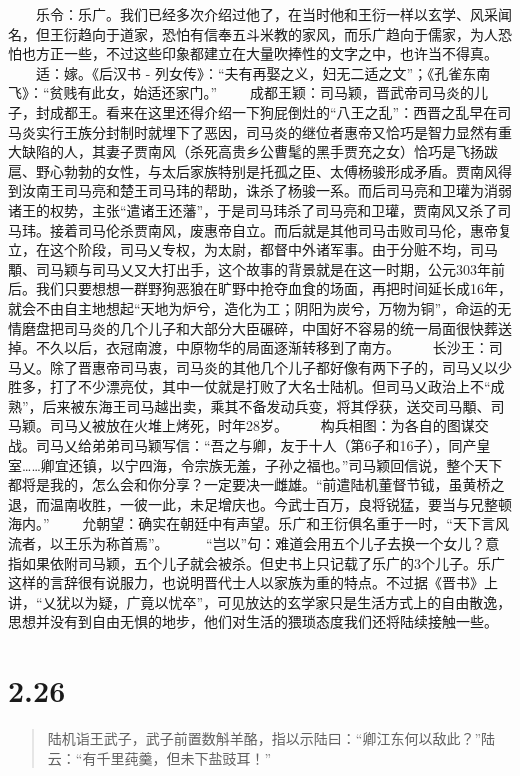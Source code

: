 \documentclass[]{book}
\begin{document}
　　乐令：乐广。我们已经多次介绍过他了，在当时他和王衍一样以玄学、风采闻名，但王衍趋向于道家，恐怕有信奉五斗米教的家风，而乐广趋向于儒家，为人恐怕也方正一些，不过这些印象都建立在大量吹捧性的文字之中，也许当不得真。
　　适：嫁。《后汉书 -
列女传》：``夫有再娶之义，妇无二适之文''；《孔雀东南飞》：``贫贱有此女，始适还家门。''
　　成都王颖：司马颖，晋武帝司马炎的儿子，封成都王。看来在这里还得介绍一下狗屁倒灶的``八王之乱''：西晋之乱早在司马炎实行王族分封制时就埋下了恶因，司马炎的继位者惠帝又恰巧是智力显然有重大缺陷的人，其妻子贾南风（杀死高贵乡公曹髦的黑手贾充之女）恰巧是飞扬跋扈、野心勃勃的女性，与太后家族特别是托孤之臣、太傅杨骏形成矛盾。贾南风得到汝南王司马亮和楚王司马玮的帮助，诛杀了杨骏一系。而后司马亮和卫瓘为消弱诸王的权势，主张``遣诸王还藩''，于是司马玮杀了司马亮和卫瓘，贾南风又杀了司马玮。接着司马伦杀贾南风，废惠帝自立。而后就是其他司马击败司马伦，惠帝复立，在这个阶段，司马乂专权，为太尉，都督中外诸军事。由于分赃不均，司马顒、司马颖与司马乂又大打出手，这个故事的背景就是在这一时期，公元303年前后。我们只要想想一群野狗恶狼在旷野中抢夺血食的场面，再把时间延长成16年，就会不由自主地想起``天地为炉兮，造化为工；阴阳为炭兮，万物为铜''，命运的无情磨盘把司马炎的几个儿子和大部分大臣碾碎，中国好不容易的统一局面很快葬送掉。不久以后，衣冠南渡，中原物华的局面逐渐转移到了南方。
　　长沙王：司马乂。除了晋惠帝司马衷，司马炎的其他几个儿子都好像有两下子的，司马乂以少胜多，打了不少漂亮仗，其中一仗就是打败了大名士陆机。但司马乂政治上不``成熟''，后来被东海王司马越出卖，乘其不备发动兵变，将其俘获，送交司马顒、司马颖。司马乂被放在火堆上烤死，时年28岁。
　　构兵相图：为各自的图谋交战。司马乂给弟弟司马颖写信：``吾之与卿，友于十人（第6子和16子），同产皇室\ldots{}\ldots{}卿宜还镇，以宁四海，令宗族无羞，子孙之福也。''司马颖回信说，整个天下都将是我的，怎么会和你分享？一定要决一雌雄。``前遣陆机董督节钺，虽黄桥之退，而温南收胜，一彼一此，未足增庆也。今武士百万，良将锐猛，要当与兄整顿海内。''
　　允朝望：确实在朝廷中有声望。乐广和王衍俱名重于一时，``天下言风流者，以王乐为称首焉''。
　　
``岂以''句：难道会用五个儿子去换一个女儿？意指如果依附司马颖，五个儿子就会被杀。但史书上只记载了乐广的3个儿子。乐广这样的言辞很有说服力，也说明晋代士人以家族为重的特点。不过据《晋书》上讲，``乂犹以为疑，广竟以忧卒''，可见放达的玄学家只是生活方式上的自由散逸，思想并没有到自由无惧的地步，他们对生活的猥琐态度我们还将陆续接触一些。

\section{2.26}\label{section-72}

\begin{quote}
陆机诣王武子，武子前置数斛羊酪，指以示陆曰：``卿江东何以敌此？''陆云：``有千里莼羹，但未下盐豉耳！''
\end{quote}
\end{document}
